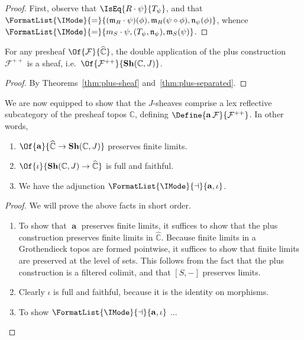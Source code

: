 \documentclass{article}
\newcommand\Psh[1]{\widehat{#1}}
\newcommand\Sh[1]{\mathbf{Sh} (#1)}
\newcommand\AreEq[1]{\FormatList{\IMode}{=}{#1}}
\DeclareMathOperator{\Sheafify}{\mathbf{a}}
\newcommand\AreAdjoint[1]{\FormatList{\IMode}{\dashv}{#1}}
\newcommand\PlusPlus[1]{{#1}^{++}}
\begin{document}
\begin{proof}
  First, observe that $\IsEq{R\cdot\psi}{T_\psi}$, and that
  $\AreEq{(\mathfrak{m}_R\cdot\psi)(\phi),\mathfrak{m}_R(\psi\circ\phi),\mathfrak{n}_\psi(\phi)}$,
  whence
  $\AreEq{m_S\cdot\psi,{(T_\psi,\mathfrak{n}_\psi)},\mathfrak{m}_S(\psi)}$.
\end{proof}

\begin{cor}
  For any presheaf $\Of{\mathcal{F}}{\Psh{\mathbb{C}}}$, the double application
  of the plus construction $\PlusPlus{\mathcal{F}}$ is a sheaf, i.e.\
  $\Of{\PlusPlus{\mathcal{F}}}{\Sh{\mathbb{C},J}}$.
\end{cor}
\begin{proof}
  By Theorems~\ref{thm:plus-sheaf} and~\ref{thm:plus-separated}.
\end{proof}



\begin{thm}[Sheafification]
  We are now equipped to show that the $J$-sheaves comprise a lex
  reflective subcategory of the presheaf topos $\mathbb{C}$, defining
  $\Define{\Sheafify{\mathcal{F}}}{\PlusPlus{\mathcal{F}}}$. In other words,
  \begin{enumerate}
  \item $\Of{\Sheafify}{\Psh{\mathbb{C}}\to\Sh{\mathbb{C},J}}$
    preserves finite limits.
  \item $\Of{\iota}{\Sh{\mathbb{C},J}\to\Psh{\mathbb{C}}}$ is full and
    faithful.
  \item We have the adjunction $\AreAdjoint{\Sheafify,\iota}$.
  \end{enumerate}
\end{thm}
\begin{proof}
\newcommand\Amalg[1]{\llparenthesis{#1}\rrparenthesis}
  We will prove the above facts in short order.

  \begin{enumerate}
  \item To show that $\Sheafify$ preserves finite limits, it suffices
    to show that the plus construction preserves finite limits in
    $\Psh{\mathbb{C}}$. Because finite limits in a Grothendieck topos
    are formed pointwise, it suffices to show that finite limits are
    preserved at the level of sets. This follows from the fact that
    the plus construction is a filtered colimit, and that $[S,-]$
    preserves limits.
  \item Clearly $\iota$ is full and faithful, because it is the identity
    on morphisms.
  \item To show $\AreAdjoint{\Sheafify,\iota}$ ...
    
  \end{enumerate}
\end{proof}
\end{document}
